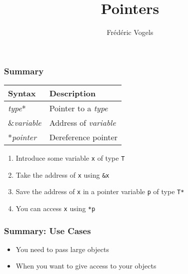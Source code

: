 \usepackage{ucll-code}

\usetikzlibrary{shadows,shapes.multipart}

\title{Pointers}
\author{Fr\'ed\'eric Vogels}




\begin{frame}
  \titlepage
\end{frame}






\begin{frame}
  \frametitle{Summary}
  \begin{center}
    \begin{tabular}{ll}
      \textbf{Syntax}  & \textbf{Description} \\
      \toprule
      {\it type}*      & Pointer to a {\it type} \\
      \&{\it variable} & Address of {\it variable} \\
      *{\it pointer}   & Dereference pointer \\
    \end{tabular}
  \end{center}
  \begin{enumerate}
    \item Introduce some variable \texttt{x} of type \texttt{T}
    \item Take the address of \texttt{x} using \texttt{\&x}
    \item Save the address of \texttt{x} in a pointer variable \texttt{p} of type \texttt{T*}
    \item You can access \texttt{x} using \texttt{*p}
  \end{enumerate}
\end{frame}

\begin{frame}
  \frametitle{Summary: Use Cases}
  \begin{itemize}
    \item You need to pass large objects
    \item When you want to give access to your objects
  \end{itemize}
\end{frame}




